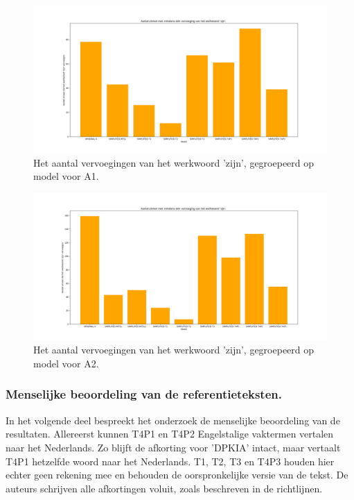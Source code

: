 \begin{figure}[H]
	\includegraphics[width=\linewidth]{img/boxplot-tobe-a1.png}
	\caption{Het aantal vervoegingen van het werkwoord 'zijn', gegroepeerd op model voor A1.}
	\label{img:histplot-tobe-a1}
\end{figure}

\begin{figure}[H]
	\includegraphics[width=\linewidth]{img/boxplot-tobe-a2.png}
	\caption{Het aantal vervoegingen van het werkwoord 'zijn', gegroepeerd op model voor A2.}
	\label{img:histplot-tobe-a2}
\end{figure}

\subsubsection{Menselijke beoordeling van de referentieteksten.}

In het volgende deel bespreekt het onderzoek de menselijke beoordeling van de resultaten. Allereerst kunnen T4P1 en T4P2 Engelstalige vaktermen vertalen naar het Nederlands. Zo blijft de afkorting voor 'DPKIA' intact, maar vertaalt T4P1 hetzelfde woord naar het Nederlands.  T1, T2, T3 en T4P3 houden hier echter geen rekening mee en behouden de oorspronkelijke versie van de tekst. De auteurs schrijven alle afkortingen voluit, zoals beschreven in de richtlijnen.

